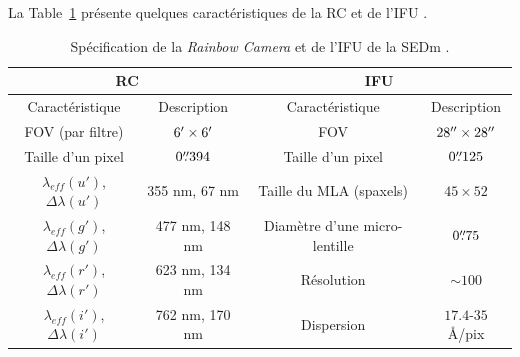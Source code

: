 \documentclass[../main/main.tex]{subfiles}
\begin{document}
La Table~\ref{tab:sedmspecification} présente
quelques caractéristiques de la RC et de l'IFU \citep{SEDM18}.

\begin{table}[ht]
  \centerfloat
  \renewcommand{\arraystretch}{1.5}
  \begin{threeparttable}
    \caption{Spécification de la \textit{Rainbow Camera} et de l'IFU
      de la SEDm \citep{SEDM18}.}
    \label{tab:sedmspecification}
    \begin{tabular}{cc||cc}
      \toprule
      \multicolumn{2}{c||}{RC} & \multicolumn{2}{c}{IFU} \\
      \midrule
      Caractéristique & Description & Caractéristique & Description\\
      \midrule
      FOV (par filtre) & $6^\prime\times6^\prime$ & FOV &
                                             $28^{\prime\prime}\times28^{\prime\prime}$\\
      Taille d'un pixel & $0\overset{\prime\prime}{.}394$ & Taille d'un pixel &
                                                             $0\overset{\prime\prime}{.}125$\\
      $\lambda_{eff}(u')$, $\Delta\lambda(u')$ & 355 nm, 67 nm & Taille
                                                                du
                                                                MLA (spaxels)
                                    & $45\times52$\\
      $\lambda_{eff}(g')$, $\Delta\lambda(g')$ & 477 nm, 148 nm & Diamètre
                                                                d'une
                                                                micro-lentille&
                                                                          $0\overset{\prime\prime}{.}75$\\
      $\lambda_{eff}(r')$, $\Delta\lambda(r')$ & 623 nm, 134 nm &
                                                                  Résolution
                                    & $\sim100$\\
      
      $\lambda_{eff}(i')$, $\Delta\lambda(i')$ & 762 nm, 170 nm &
                                                                  Dispersion& $17.4$-$35$\AA/pix\\
      \bottomrule
    \end{tabular}
  \end{threeparttable}
\end{table}
\end{document}
